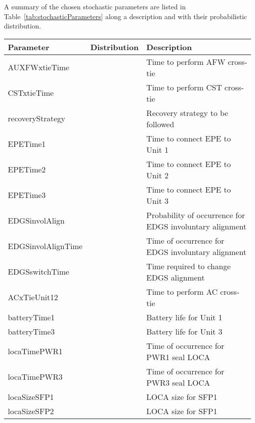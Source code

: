 A summary of the chosen stochastic parameters are listed in Table~\ref{tab:stochasticParameters} 
along a description and with their probabilistic distribution.

\begin{table}
  \begin{center}
      \begin{tabular}{ | l | p{5cm} | p{5cm} |}
        \hline
         Parameter          & Distribution & Description                      \\ \hline \hline
         AUXFWxtieTime      &              & Time to perform AFW cross-tie    \\ \hline
         CSTxtieTime        &              & Time to perform CST cross-tie    \\ \hline
         recoveryStrategy   &              & Recovery strategy to be followed \\ \hline
         EPETime1           &              & Time to connect EPE to Unit 1    \\ \hline
         EPETime2           &              & Time to connect EPE to Unit 2    \\ \hline
         EPETime3           &              & Time to connect EPE to Unit 3    \\ \hline
         EDGSinvolAlign     &              & Probability of occurrence for EDGS involuntary alignment   \\ \hline
         EDGSinvolAlignTime &              & Time of occurrence for EDGS involuntary alignment          \\ \hline
         EDGSswitchTime     &              & Time required to change EDGS alignment  \\ \hline
         ACxTieUnit12       &              & Time to perform AC cross-tie     \\ \hline
         batteryTime1       &              & Battery life for Unit 1          \\ \hline
         batteryTime3       &              & Battery life for Unit 3          \\ \hline
         locaTimePWR1       &              & Time of occurrence for PWR1 seal LOCA   \\ \hline
         locaTimePWR3       &              & Time of occurrence for PWR3 seal LOCA   \\ \hline
         locaSizeSFP1       &              & LOCA size for SFP1               \\ \hline
         locaSizeSFP2       &              & LOCA size for SFP1               \\ \hline

\end{tabular}
\end{center}
\end{table}
